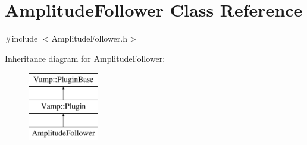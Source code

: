 \hypertarget{class_amplitude_follower}{}\section{Amplitude\+Follower Class Reference}
\label{class_amplitude_follower}


{\ttfamily \#include $<$Amplitude\+Follower.\+h$>$}

Inheritance diagram for Amplitude\+Follower\+:\begin{figure}[H]
\begin{center}
\leavevmode
\includegraphics[height=3.000000cm]{class_amplitude_follower}
\end{center}
\end{figure}
